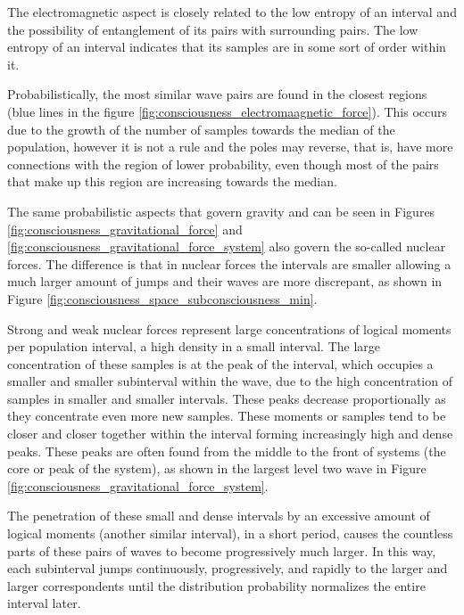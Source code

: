 The electromagnetic aspect is closely related to the low entropy of an interval and the possibility of entanglement of its pairs with surrounding pairs. The low entropy of an interval indicates that its samples are in some sort of order within it.

Probabilistically, the most similar wave pairs are found in the closest regions (blue lines in the figure \ref{fig:consciousness_electromaagnetic_force}). This occurs due to the growth of the number of samples towards the median of the population, however it is not a rule and the poles may reverse, that is, have more connections with the region of lower probability, even though most of the pairs that make up this region are increasing towards the median.

The same probabilistic aspects that govern gravity and can be seen in Figures \ref{fig:consciousness_gravitational_force} and \ref{fig:consciousness_gravitational_force_system} also govern the so-called nuclear forces. The difference is that in nuclear forces the intervals are smaller allowing a much larger amount of jumps and their waves are more discrepant, as shown in Figure \ref{fig:consciousness_space_subconsciousness_min}.

Strong and weak nuclear forces represent large concentrations of logical moments per population interval, a high density in a small interval. The large concentration of these samples is at the peak of the interval, which occupies a smaller and smaller subinterval within the wave, due to the high concentration of samples in smaller and smaller intervals. These peaks decrease proportionally as they concentrate even more new samples. These moments or samples tend to be closer and closer together within the interval forming increasingly high and dense peaks. These peaks are often found from the middle to the front of systems (the core or peak of the system), as shown in the largest level two wave in Figure \ref{fig:consciousness_gravitational_force_system}.

The penetration of these small and dense intervals by an excessive amount of logical moments (another similar interval), in a short period, causes the countless parts of these pairs of waves to become progressively much larger. In this way, each subinterval jumps continuously, progressively, and rapidly to the larger and larger correspondents until the distribution probability normalizes the entire interval later.

